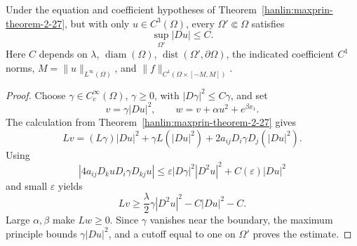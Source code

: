 \begin{proposition}\label{hanlin:maxprin-prop-2-28}
Under the equation and coefficient hypotheses of
Theorem~\ref{hanlin:maxprin-theorem-2-27}, but with only
$u\in C^3(\Omega)$, every $\Omega'\Subset\Omega$ satisfies
\[
\sup_{\Omega'}|Du|\le C.
\]
Here $C$ depends on $\lambda$, $\operatorname{diam}(\Omega)$,
$\operatorname{dist}(\Omega',\partial\Omega)$, the indicated coefficient
$C^1$ norms, $M=\|u\|_{L^\infty(\Omega)}$, and
$\|f\|_{C^1(\Omega\times[-M,M])}$.
\end{proposition}
\begin{proof}
\sketch Choose $\gamma\in C_c^\infty(\Omega)$, $\gamma\ge0$, with
$|D\gamma|^2\le C\gamma$, and set
\[
v=\gamma|Du|^2,
\qquad
w=v+\alpha u^2+e^{\beta x_1}.
\]
The calculation from Theorem~\ref{hanlin:maxprin-theorem-2-27} gives
\[
Lv=(L\gamma)|Du|^2+\gamma L(|Du|^2)
+2a_{ij}D_i\gamma D_j(|Du|^2).
\]
Using
\[
|4a_{ij}D_kuD_i\gamma D_{kj}u|
\le\varepsilon|D\gamma|^2|D^2u|^2+C(\varepsilon)|Du|^2
\]
and small $\varepsilon$ yields
\[
Lv\ge\frac\lambda2\gamma|D^2u|^2-C|Du|^2-C.
\]
Large $\alpha,\beta$ make $Lw\ge0$. Since $\gamma$ vanishes near the boundary,
the maximum principle bounds $\gamma|Du|^2$, and a cutoff equal to one on
$\Omega'$ proves the estimate.
\end{proof}

